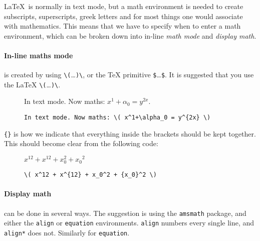 \LaTeX\ is normally in text mode, but a math environment is needed to create subscripts, superscripts, greek letters and for most things one would associate with mathematics.
This means that we have to specify when to enter a math environment, which can be broken down into in-line \emph{math mode} and \emph{display math}.

\paragraph{In-line maths mode} is created by using \verb|\(|\dots \verb|)\|, or the \TeX{} primitive \verb|$|\dots\verb|$|.
It is suggested that you use the \LaTeX{} \verb|\(|\dots \verb|)\|.
\begin{figure}[h]
    \centering
    \begin{minipage}{0.46\textwidth}
        In text mode. Now maths: \( x^1+\alpha_0 = y^{2x} \).
    \end{minipage}
    \begin{minipage}{0.48\textwidth}
        \begin{lstlisting}
In text mode. Now maths: \( x^1+\alpha_0 = y^{2x} \)
        \end{lstlisting}
    \end{minipage}
\end{figure}

\verb|{}| is how we indicate that everything inside the brackets should be kept together.
This should become clear from the following code:
\begin{figure}[h]
\begin{minipage}{0.45\textwidth} \centering
    \( x^12 + x^{12} + x_0^2 + {x_0}^2 \)
\end{minipage}
\begin{minipage}{0.49\textwidth}
    \begin{lstlisting}
\( x^12 + x^{12} + x_0^2 + {x_0}^2 \)
    \end{lstlisting}    
\end{minipage}
\end{figure}

\paragraph{Display math} can be done in several ways.
The suggestion is using the \verb|amsmath| package, and either the \verb|align| or \verb|equation| environments.
\texttt{align} numbers every single line, and \texttt{align*} does not. Similarly for \verb|equation|.

